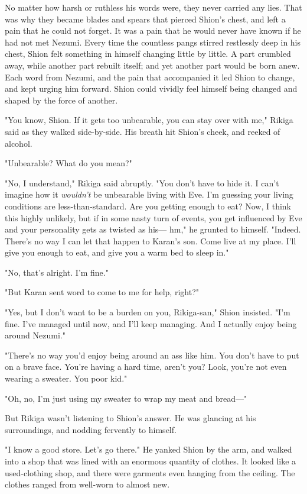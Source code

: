 No matter how harsh or ruthless his words were, they never carried any
lies. That was why they became blades and spears that pierced Shion's
chest, and left a pain that he could not forget. It was a pain that he
would never have known if he had not met Nezumi. Every time the
countless pangs stirred restlessly deep in his chest, Shion felt
something in himself changing little by little. A part crumbled away,
while another part rebuilt itself; and yet another part would be born
anew. Each word from Nezumi, and the pain that accompanied it led Shion
to change, and kept urging him forward. Shion could vividly feel himself
being changed and shaped by the force of another.

"You know, Shion. If it gets too unbearable, you can stay over with me,"
Rikiga said as they walked side-by-side. His breath hit Shion's cheek,
and reeked of alcohol.

"Unbearable? What do you mean?"

"No, I understand," Rikiga said abruptly. "You don't have to hide it. I
can't imagine how it \emph{wouldn't} be unbearable living with Eve. I'm
guessing your living conditions are less-than-standard. Are you getting
enough to eat? Now, I think this highly unlikely, but if in some nasty
turn of events, you get influenced by Eve and your personality gets as
twisted as his--- hm," he grunted to himself. "Indeed. There's no way I
can let that happen to Karan's son. Come live at my place. I'll give you
enough to eat, and give you a warm bed to sleep in."

"No, that's alright. I'm fine."

"But Karan sent word to come to me for help, right?"

"Yes, but I don't want to be a burden on you, Rikiga-san," Shion
insisted. "I'm fine. I've managed until now, and I'll keep managing. And
I actually enjoy being around Nezumi."

"There's no way you'd enjoy being around an ass like him. You don't have
to put on a brave face. You're having a hard time, aren't you? Look,
you're not even wearing a sweater. You poor kid."

"Oh, no, I'm just using my sweater to wrap my meat and bread---"

But Rikiga wasn't listening to Shion's answer. He was glancing at his
surroundings, and nodding fervently to himself.

"I know a good store. Let's go there." He yanked Shion by the arm, and
walked into a shop that was lined with an enormous quantity of clothes.
It looked like a used-clothing shop, and there were garments even
hanging from the ceiling. The clothes ranged from well-worn to almost
new.

